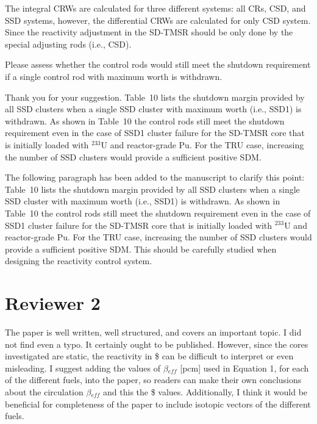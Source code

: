 \documentclass[answers,11pt]{exam}
\begin{document}
\begin{questions}
\begin{solution}
	The integral CRWs are calculated for three different systems: all CRs, CSD, and SSD systems, however, the differential CRWs are calculated for only CSD system. Since the reactivity adjustment in the SD-TMSR should be only done by the special adjusting rods (i.e., CSD).
	
	
\end{solution}

\question Please assess whether the control rods would still meet the shutdown requirement if a single control rod with maximum worth is withdrawn.
\begin{solution}
	
	Thank you for your suggestion. Table~10 lists the shutdown margin provided by all SSD clusters when a single SSD cluster with maximum worth (i.e., SSD1) is withdrawn. As shown in Table~10 the control rods still meet the shutdown requirement even in the case of SSD1 cluster failure for the SD-TMSR core that is initially loaded with $^{233}$U and reactor-grade Pu. For the TRU case, increasing the number of SSD clusters would provide a sufficient positive SDM.
	
		The following paragraph has been added to the manuscript to clarify this point:\\
	
	Table~10 lists the shutdown margin provided by all SSD clusters when a single SSD cluster with maximum worth (i.e., SSD1) is withdrawn. As shown in Table~10 the control rods still meet the shutdown requirement even in the case of SSD1 cluster failure for the SD-TMSR core that is initially loaded with $^{233}$U and reactor-grade Pu. For the TRU case, increasing the number of SSD clusters would provide a sufficient positive SDM. This should be carefully studied when designing the reactivity control system. 
	
	
\end{solution}

        \section*{Reviewer 2}

        \question The paper is well written, well structured, and covers an important topic. I did not find even a typo. It certainly ought to be published. However, since the cores investigated are static, the reactivity in \$ can be difficult to interpret or even misleading. I suggest adding the values of $\beta$$_{eff}$ [pcm] used in Equation 1, for each of the different fuels, into the paper, so readers can make their own conclusions about the circulation $\beta$$_{eff}$ and this the \$ values. Additionally, I think it would be beneficial for completeness of the paper to include isotopic vectors of the different fuels.
        

\end{questions}
\end{document}
